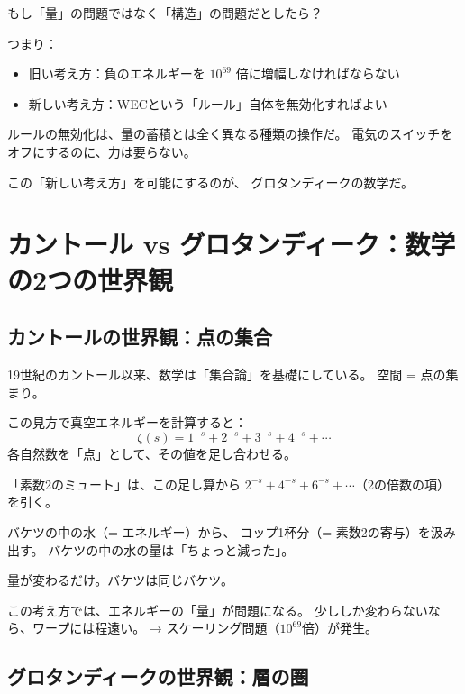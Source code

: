 \documentclass[12pt,a4paper]{article}
\begin{document}
もし「量」の問題ではなく「構造」の問題だとしたら？

つまり：
\begin{itemize}
\item 旧い考え方：負のエネルギーを $10^{69}$ 倍に増幅しなければならない
\item 新しい考え方：WECという「ルール」自体を無効化すればよい
\end{itemize}

ルールの無効化は、量の蓄積とは全く異なる種類の操作だ。
電気のスイッチをオフにするのに、力は要らない。

この「新しい考え方」を可能にするのが、
グロタンディークの数学だ。

\section{カントール vs グロタンディーク：数学の2つの世界観}
\label{sec:cantor_vs_grothendieck}

\subsection{カントールの世界観：点の集合}

19世紀のカントール以来、数学は「集合論」を基礎にしている。
空間 = 点の集まり。

この見方で真空エネルギーを計算すると：
$$
\zeta(s) = 1^{-s} + 2^{-s} + 3^{-s} + 4^{-s} + \cdots
$$
各自然数を「点」として、その値を足し合わせる。

「素数2のミュート」は、この足し算から
$2^{-s} + 4^{-s} + 6^{-s} + \cdots$（2の倍数の項）を引く。

\begin{analogybox}
バケツの中の水（= エネルギー）から、
コップ1杯分（= 素数2の寄与）を汲み出す。
バケツの中の水の量は「ちょっと減った」。

量が変わるだけ。バケツは同じバケツ。
\end{analogybox}

この考え方では、エネルギーの「量」が問題になる。
少ししか変わらないなら、ワープには程遠い。
→ スケーリング問題（$10^{69}$倍）が発生。

\subsection{グロタンディークの世界観：層の圏}
\end{document}
